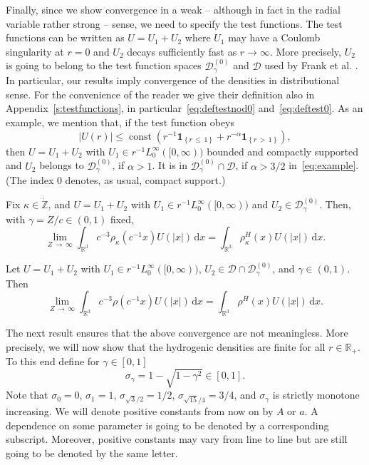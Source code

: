 \documentclass[AHL,Unicode,longabstracts,published]{cedram}
\DeclareMathOperator{\const}{const}
\newcommand*\rd{\mathrm{d}}
\newcommand*\dx{\mathrm{d}x}
\newcommand*\gz{\mathbb{Z}}
\newcommand*\rz{\mathbb{R}}
\newcommand*\zp{\dot{\gz}}
\newcommand{\one}{\mathbf{1}}
\newcommand*\cD{\mathcal{D}}
\begin{document}
Finally, since we show convergence in a weak -- although in fact in the radial variable rather strong -- sense, we need to specify the test functions. The test functions can be written as $U=U_1+U_2$ where $U_1$ may have a Coulomb singularity at $r=0$ and $U_2$ decays sufficiently fast as $r\to\infty$. More precisely, $U_2$ is going to belong to the test function spaces $\cD_\gamma^{(0)}$ and $\cD$ used by Frank et al. \cite{Franketal2020P}. In particular, our results imply convergence of the densities in distributional sense. For the convenience of the reader we give their definition also in Appendix~\ref{s:testfunctions}, in particular~\eqref{eq:deftestnod0} and~\eqref{eq:deftest0}. As an example, we mention that, if the test function obeys
\begin{equation}\label{eq:example}
|U(r)| \leq \const \left(r^{-1}\one_{\left\{r\,\leq\,1\right\}} + r^{-\alpha}\one_{\left\{r\,>\,1\right\}}\right),
\end{equation}
then $U=U_1+U_2$ with $U_1\in r^{-1}L^\infty_0 ([0,\infty))$ bounded and compactly supported and $U_2$ belongs to $\cD_\gamma^{(0)}$, if $\alpha>1$. It is in $\cD_\gamma^{(0)}\cap\cD$, if $\alpha>3/2$ in~\eqref{eq:example}. (The index $0$ denotes, as usual, compact support.)

\begin{theo}\label{convfixedl}
Fix $\kappa\in\zp$, and $U=U_1+U_2$ with $U_1\in r^{-1}L^\infty_0 ([0,\infty))$ and $U_2\in\cD_\gamma^{(0)}$. Then, with $\gamma=Z/c\in(0,1)$ fixed,
\[
\lim_{Z\,\to\,\infty}\int_{\rz^3} c^{-3}\rho_{\kappa}\left(c^{-1}x\right)U(|x|)\,\rd x = \int_{\rz^3}\rho_{\kappa}^H(x)U(|x|)\,\rd x.
\]
\end{theo}

\begin{theo}\label{convalll}
Let $U=U_1+U_2$ with $U_1\in r^{-1}L^\infty_0 ([0,\infty))$, $U_2\in\cD\cap\cD_\gamma^{(0)}$, and $\gamma\in(0,1)$. Then
\[
\lim_{Z\,\to\,\infty}\int_{\rz^3} c^{-3}\rho\left(c^{-1}x\right)U(|x|)\,\dx = \int_{\rz^3} \rho^H(x)U(|x|)\,\dx.
\]
\end{theo}

The next result ensures that the above convergence are not meaningless. More precisely, we will now show that the hydrogenic densities are finite for all $r\in\rz_+$. To this end define for $\gamma\in[0,1]$
\begin{equation}\label{eq:defsigmagamma}
\sigma_\gamma = 1-\sqrt{1-\gamma^2}\in[0,1].
\end{equation}
Note that $\sigma_0=0$, $\sigma_1=1$, $\sigma_{\sqrt3/2}=1/2$, $\sigma_{\sqrt{15}/4}=3/4$, and $\sigma_\gamma$ is strictly monotone increasing. We will denote positive constants from now on by $A$ or $a$. A dependence on some parameter is going to be denoted by a corresponding subscript. Moreover, positive constants may vary from line to line but are still going to be denoted by the same letter.
\end{document}
